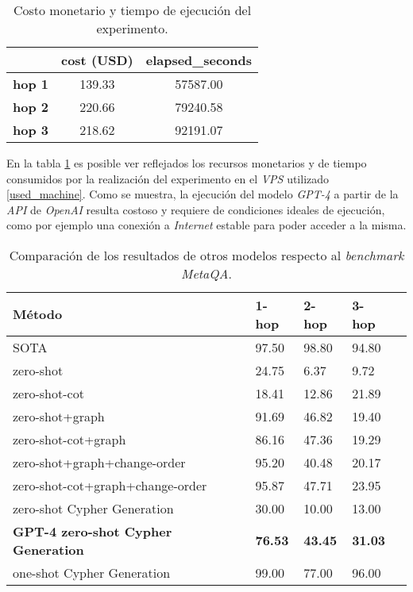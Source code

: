 \begin{table}[H]
\centering
\begin{tabular}{|c|c|c|}
\hline
& \textbf{cost (USD)} & \textbf{elapsed\_seconds} \\ \hline
\textbf{hop 1} & 139.33 & 57587.00 \\ \hline
\textbf{hop 2} & 220.66 & 79240.58 \\ \hline
\textbf{hop 3} & 218.62 & 92191.07 \\ \hline
\end{tabular}
\caption{Costo monetario y tiempo de ejecución del experimento.}
\label{tab:results2}
\end{table}

En la tabla \ref{tab:results2} es posible ver reflejados los recursos monetarios y de tiempo consumidos por la realización del experimento en el \textit{VPS} utilizado \ref{used_machine}. Como se muestra, la ejecución del modelo \textit{GPT-4} a partir de la \textit{API} de \textit{OpenAI} resulta costoso y requiere de condiciones ideales de ejecución, como por ejemplo una conexión a \textit{Internet} estable para poder acceder a la misma.

\begin{table}[H]
\centering
\begin{tabular}{|l|l|l|l|l}
\hline
Método & 1-hop & 2-hop & 3-hop \\
\hline
SOTA  & 97.50 & 98.80 & 94.80 \\
\hline
zero-shot  & 24.75 & 6.37 & 9.72 \\
\hline
zero-shot-cot & 18.41 & 12.86 & 21.89 \\
\hline
zero-shot+graph & 91.69 & 46.82 & 19.40 \\
\hline
zero-shot-cot+graph & 86.16 & 47.36 & 19.29 \\
\hline
zero-shot+graph+change-order & 95.20 & 40.48 & 20.17 \\
\hline
zero-shot-cot+graph+change-order & 95.87 & 47.71 & 23.95 \\
\hline
zero-shot Cypher Generation  & 30.00 & 10.00 & 13.00 \\
\hline
\textbf{GPT-4 zero-shot Cypher Generation}  & \textbf{76.53} & \textbf{43.45} & \textbf{31.03} \\
\hline
one-shot Cypher Generation & 99.00 & 77.00 & 96.00 \\
\hline
\end{tabular}
\caption{Comparación de los resultados de otros modelos respecto al \textit{benchmark MetaQA}.}
\label{tab:results3}
\end{table}

